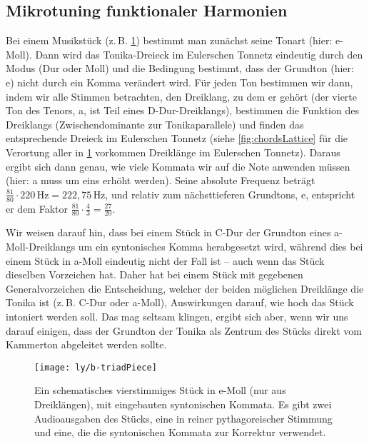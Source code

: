 \subsection{Mikrotuning funktionaler Harmonien}

Bei einem Musikstück (z.\,B. \cref{fig:triadPiece}) bestimmt man zunächst seine
Tonart (hier: e-Moll). Dann wird das Tonika-Dreieck im Eulerschen Tonnetz
eindeutig durch den Modus (Dur oder Moll) und die Bedingung bestimmt, dass der
Grundton (hier: e) nicht durch ein Komma verändert wird. Für jeden Ton bestimmen
wir dann, indem wir alle Stimmen betrachten, den Dreiklang, zu dem er gehört
(der vierte Ton des Tenors, a, ist Teil eines D-Dur-Dreiklangs), bestimmen die
Funktion des Dreiklangs (Zwischendominante zur Tonikaparallele) und finden das
entsprechende Dreieck im Eulerschen Tonnetz (siehe \cref{fig:chordsLattice} für
die Verortung aller in \cref{fig:triadPiece} vorkommen Dreiklänge im Eulerschen
Tonnetz). Daraus ergibt sich dann genau, wie viele Kommata wir auf die Note
anwenden müssen (hier: a muss um eins erhöht werden). Seine absolute Frequenz
beträgt $\frac{81}{80}\cdot 220\,\text{Hz}=222{,}75\,\text{Hz}$, und relativ zum
nächsttieferen Grundtons, e, entspricht er dem Faktor
$\frac{81}{80}\cdot\frac{4}{3}=\frac{27}{20}$.

Wir weisen darauf hin, dass bei einem Stück in C-Dur der Grundton eines
a-Moll-Dreiklangs um ein syntonisches Komma herabgesetzt wird, während dies bei
einem Stück in a-Moll eindeutig nicht der Fall ist – auch wenn das Stück
dieselben Vorzeichen hat. Daher hat bei einem Stück mit gegebenen
Generalvorzeichen die Entscheidung, welcher der beiden möglichen Dreiklänge die
Tonika ist (z.\,B. C-Dur oder a-Moll), Auswirkungen darauf, wie hoch das Stück
intoniert werden soll. Das mag seltsam klingen, ergibt sich aber, wenn wir uns
darauf einigen, dass der Grundton der Tonika als Zentrum des Stücks direkt vom
Kammerton abgeleitet werden sollte.

\begin{figure}
  \centering
  \texttt{[image: ly/b-triadPiece]}
  \caption{Ein schematisches vierstimmiges Stück in e-Moll (nur aus
  	Dreiklängen), mit eingebauten syntonischen Kommata. Es gibt zwei
  	Audioausgaben des Stücks, eine in reiner pythagoreischer Stimmung und eine,
  	die die syntonischen Kommata zur Korrektur
  	verwendet.}\label{fig:triadPiece}
\end{figure}


